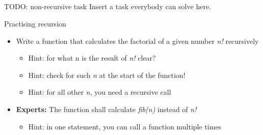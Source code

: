 \subsection{}
\begin{frame}{TODO: non-recursive task}
	Insert a task everybody can solve here.
\end{frame}
\begin{frame}{Practising recursion}
	\begin{itemize}
		\item Write a function that calculates the factorial of a given number \textit{n!}    recursively
		\begin{itemize}
			\item<2-> Hint: for what n is the result of \textit{n!} clear?
			\item<3-> Hint: check for such \textit{n} at the start of the function!
			\item<4-> Hint: for all other \textit{n}, you need a recursive call
		\end{itemize}
		\item \textbf{Experts:} The function shall calculate \textit{fib(n)} instead of \textit{n!}
		\begin{itemize}
			\item<2-> Hint: in one statement, you can call a function multiple times
		\end{itemize}
	\end{itemize}
\end{frame}

